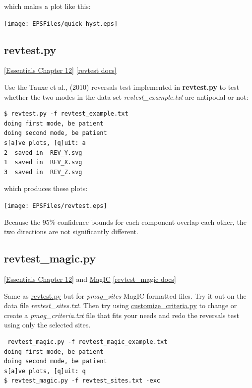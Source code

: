 \documentclass[11pt]{book}
\begin{document}
{{{{which makes a plot like this:

\texttt{[image: EPSFiles/quick\_hyst.eps]}


\subsection{revtest.py}
\href{http://earthref.org/MAGIC/books/Tauxe/Essentials/WebBook3ch12.html#ch12}{[Essentials Chapter 12]}
\href{https://github.com/PmagPy/PmagPy/blob/master/programs/revtest.py}{[revtest docs]}

Use the Tauxe et al., (2010) reversals test implemented in {\bf revtest.py} to test whether the two modes in the data set {\it revtest\_example.txt} are antipodal or not:

\begin{verbatim}
$ revtest.py -f revtest_example.txt
doing first mode, be patient
doing second mode, be patient
s[a]ve plots, [q]uit: a
2  saved in  REV_Y.svg
1  saved in  REV_X.svg
3  saved in  REV_Z.svg

\end{verbatim}

\noindent which produces these plots:

{ %
\texttt{[image: EPSFiles/revtest.eps]}}

Because the 95\% confidence bounds for each component overlap each other, the two directions are not significantly different.


\subsection{revtest\_magic.py}
\href{http://earthref.org/MAGIC/books/Tauxe/Essentials/WebBook3ch12.html#ch12}{ [Essentials Chapter 12]} and \href{#MagIC}{MagIC}
\href{https://github.com/PmagPy/PmagPy/blob/master/programs/revtest_magic.py}{[revtest\_magic docs]}

Same as \href{#revtest.py}{revtest.py} but for {\it pmag\_sites} MagIC formatted files.   Try it out on the data file {\it revtest\_sites.txt}.  Then try using \href{#customize_criteria.py}{customize\_criteria.py} to change or create a {\it pmag\_criteria.txt} file that fits your needs and redo the reversals test using only the selected sites.

\begin{verbatim}
 revtest_magic.py -f revtest_magic_example.txt
doing first mode, be patient
doing second mode, be patient
s[a]ve plots, [q]uit: q
$ revtest_magic.py -f revtest_sites.txt -exc
\end{verbatim}

}}}}
\end{document}
